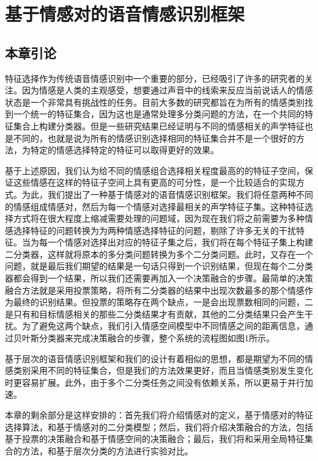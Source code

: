 \chapter{基于情感对的语音情感识别框架}
\label{cha:emo_pair_base_framework}

\section{本章引论}
\label{sec:emo_pair_base_framework_intro}
特征选择作为传统语音情感识别中一个重要的部分，已经吸引了许多的研究者的关注。因为情感是人类的主观感受，想要通过声音中的线索来反应当前说话人的情感状态是一个非常具有挑战性的任务。目前大多数的研究都旨在为所有的情感类别找到一个统一的特征集合，因为这也是通常处理多分类问题的方法，在一个共同的特征集合上构建分类器。但是一些研究结果已经证明与不同的情感相关的声学特征也是不同的，也就是说为所有的情感识别选择相同的特征集合并不是一个很好的方法，为特定的情感选择特定的特征可以取得更好的效果。

基于上述原因，我们认为给不同的情感组合选择相关程度最高的的特征子空间，保证这些情感在这样的特征子空间上具有更高的可分性，是一个比较适合的实现方式。为此，我们提出了一种基于情感对的语音情感识别框架。我们将任意两种不同的情感组成情感对，然后为每一个情感对选择最相关的声学特征子集。这种特征选择方式将在很大程度上缩减需要处理的问题域，因为现在我们将之前需要为多种情感选择特征的问题转换为为两种情感选择特征的问题，剔除了许多无关的干扰特征。当为每一个情感对选择出对应的特征子集之后，我们将在每个特征子集上构建二分类器，这样就将原本的多分类问题转换为多个二分类问题。此时，又存在一个问题，就是最后我们期望的结果是一句话只得到一个识别结果，但现在每个二分类器都会得到一个结果，所以我们还需要再加入一个决策融合的步骤。最简单的决策融合方法就是采用投票策略，将所有二分类器的结果中出现次数最多的那个情感作为最终的识别结果。但投票的策略存在两个缺点，一是会出现票数相同的问题，二是只有和目标情感相关的那些二分类结果才有贡献，其他的二分类结果只会产生干扰。为了避免这两个缺点，我们引入情感空间模型中不同情感之间的距离信息，通过贝叶斯分类器来完成决策融合的步骤，整个系统的流程图如图1所示。

基于层次的语音情感识别框架和我们的设计有着相似的思想，都是期望为不同的情感类别采用不同的特征集合，但是我们的方法效果更好，而且当情感类别发生变化时更容易扩展。此外，由于多个二分类任务之间没有依赖关系，所以更易于并行加速。

本章的剩余部分是这样安排的：首先我们将介绍情感对的定义，基于情感对的特征选择算法，和基于情感对的二分类模型；然后，我们将介绍决策融合的方法，包括基于投票的决策融合和基于情感空间的决策融合；最后，我们将和采用全局特征集合的方法，和基于层次分类的方法进行实验对比。

